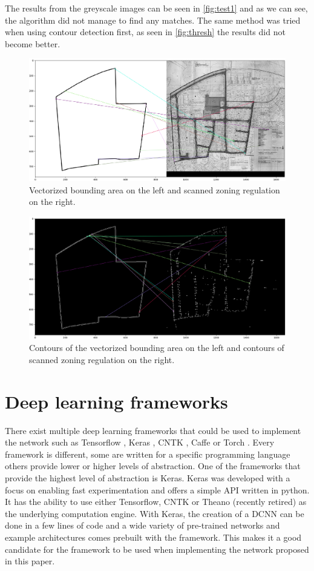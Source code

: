 The results from the greyscale images can be seen in \autoref{fig:test1} and as we can see, the algorithm did not manage to find any matches. The same method was tried when using contour detection first, as seen in \autoref{fig:thresh} the results did not become better. 


\begin{figure}[H]
    \centering
    \includegraphics[width=0.8\linewidth]{fig/test1.png}
    \caption{Vectorized bounding area on the left and scanned zoning regulation on the right.}
    \label{fig:test1}
\end{figure}

\begin{figure}[H]
    \centering
    \includegraphics[width=0.8\linewidth]{fig/test1-thresh.png}
    \caption{Contours of the vectorized bounding area on the left and contours of scanned zoning regulation on the right.}
    \label{fig:thresh}
\end{figure}

\section{Deep learning frameworks}
There exist multiple deep learning frameworks that could be used to implement the network such as Tensorflow \cite{Tensorflow2017}, Keras \cite{Keras2017}, CNTK \cite{Microsoft2017}, Caffe \cite{BerkeleyAIResearchBAIR2017} or Torch \cite{Collobert2017}.  Every framework is different, some are written for a specific programming language others provide lower or higher levels of abstraction. One of the frameworks that provide the highest level of abstraction is Keras. Keras was developed with a focus on enabling fast experimentation and offers a simple API written in python. It has the ability to use either Tensorflow, CNTK or Theano (recently retired) as the underlying computation engine. With Keras, the creation of a DCNN can be done in a few lines of code and a wide variety of pre-trained networks and example architectures comes prebuilt with the framework. This makes it a good candidate for the framework to be used when implementing the network proposed in this paper. 


